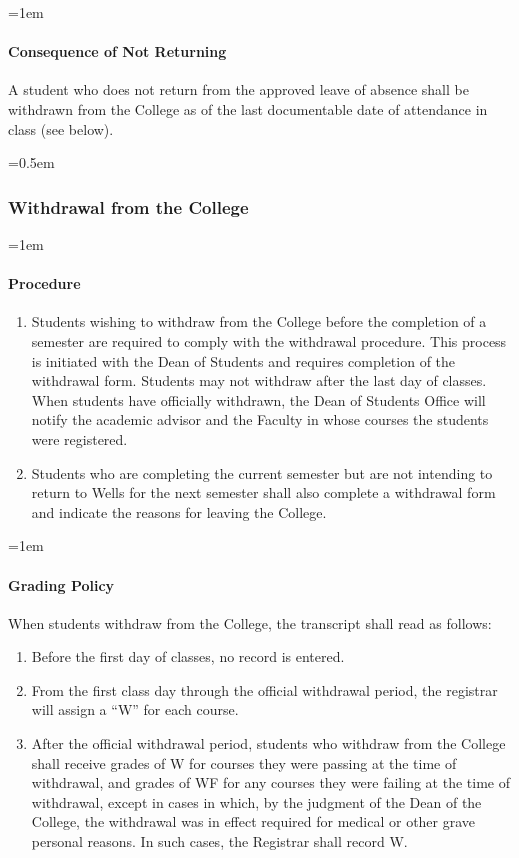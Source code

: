 \documentclass{manual}
\let\oldsubsubsection\subsubsection
\renewcommand\subsubsection{\leftskip=0.5em\oldsubsubsection}
\let\oldparagraph\paragraph
\renewcommand\paragraph{\leftskip=1em\oldparagraph}
\begin{document}
\paragraph{Consequence of Not Returning}

A student who does not return from the approved leave of absence shall be withdrawn from the College as of the last documentable date of attendance in class (see below).

\subsubsection{Withdrawal from the College}\label{sub:WithdrawlFromTheCollege}

\paragraph{Procedure}

	\begin{enumerate}[label=\alph*)]
	\item Students wishing to withdraw from the College before the completion of a semester are required to comply with the withdrawal procedure. This process is initiated with the Dean of Students and requires completion of the withdrawal form. Students may not withdraw after the last day of classes. When students have officially withdrawn, the Dean of Students Office will notify the academic advisor and the Faculty in whose courses the students were registered.
	\item Students who are completing the current semester but are not intending to return to Wells for the next semester shall also complete a withdrawal form and indicate the reasons for leaving the College.
	\end{enumerate}

\paragraph{Grading Policy}

When students withdraw from the College, the transcript shall read as follows:

	\begin{enumerate}[label=\alph*)]
	\item Before the first day of classes, no record is entered.
	\item From the first class day through the official withdrawal period, the registrar will assign a ``W'' for each course.
	\item After the official withdrawal period, students who withdraw from the College shall  receive grades of W for courses they were passing at the time of withdrawal, and grades of WF for any courses they were failing at the time of withdrawal, except in cases in which, by the judgment of the Dean of the College, the withdrawal was in effect required for medical or other grave personal reasons. In such cases, the Registrar shall record W.
	\end{enumerate}
\end{document}
